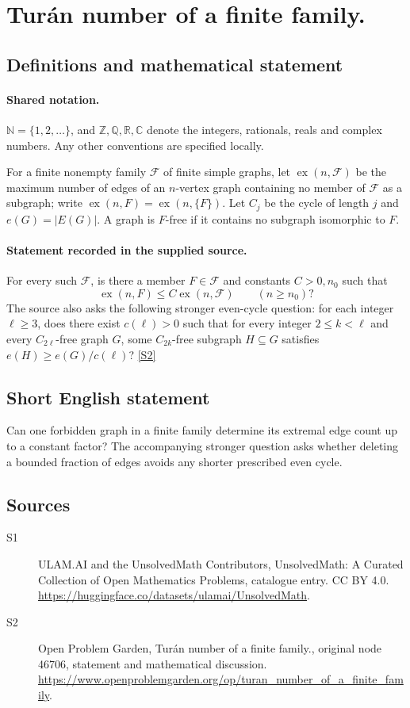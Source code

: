 \documentclass[11pt]{article}
\newcommand{\sref}[2]{\hyperlink{source:#1:#2}{[S#2]}}
\begin{document}
\section{Turán number of a finite family.}\label{statement}

\subsection{Definitions and mathematical statement}

\paragraph{Shared notation.}$\mathbb N=\{1,2,\ldots\}$, and $\mathbb Z,\mathbb Q,\mathbb R,\mathbb C$ denote the integers, rationals, reals and complex numbers. Any other conventions are specified locally.


For a finite nonempty family $\mathcal F$ of finite simple graphs, let $\operatorname{ex}(n,\mathcal F)$ be the maximum number of edges of an $n$-vertex graph containing no member of $\mathcal F$ as a subgraph; write $\operatorname{ex}(n,F)=\operatorname{ex}(n,\{F\})$. Let $C_j$ be the cycle of length $j$ and $e(G)=|E(G)|$. A graph is $F$-free if it contains no subgraph isomorphic to $F$.
\paragraph{Statement recorded in the supplied source.}
For every such $\mathcal F$, is there a member $F\in\mathcal F$ and constants $C>0,n_0$ such that \[\operatorname{ex}(n,F)\le C\operatorname{ex}(n,\mathcal F)\qquad(n\ge n_0)?\] The source also asks the following stronger even-cycle question: for each integer $\ell\ge3$, does there exist $c(\ell)>0$ such that for every integer $2\le k<\ell$ and every $C_{2\ell}$-free graph $G$, some $C_{2k}$-free subgraph $H\subseteq G$ satisfies $e(H)\ge e(G)/c(\ell)$? \sref{statement}{2}
\subsection{Short English statement}
Can one forbidden graph in a finite family determine its extremal edge count up to a constant factor? The accompanying stronger question asks whether deleting a bounded fraction of edges avoids any shorter prescribed even cycle.
\subsection{Sources}
\begin{description}
\item[\hypertarget{source:statement:1}{S1}] ULAM.AI and the UnsolvedMath Contributors, UnsolvedMath: A Curated Collection of Open Mathematics Problems, catalogue entry. CC BY 4.0. \url{https://huggingface.co/datasets/ulamai/UnsolvedMath}.
\item[\hypertarget{source:statement:2}{S2}] Open Problem Garden, Turán number of a finite family., original node 46706, statement and mathematical discussion. \url{https://www.openproblemgarden.org/op/turan_number_of_a_finite_family}.
\end{description}
\label{end:statement}
\end{document}
